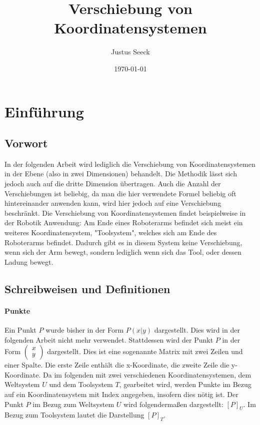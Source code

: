\documentclass{article}
\title{Verschiebung von Koordinatensystemen}
\author{Justus Seeck}
\date{\today}
\newcommand{\m}[1]{\begin{pmatrix}#1\end{pmatrix}}
\begin{document}
    \maketitle

    \tableofcontents

    \newpage

    \section{Einführung}

    \subsection{Vorwort}

    In der folgenden Arbeit wird lediglich die Verschiebung von Koordinatensystemen in der Ebene (also in zwei Dimensionen) behandelt.
    Die Methodik lässt sich jedoch auch auf die dritte Dimension übertragen. Auch die Anzahl der Verschiebungen ist beliebig, da man die
    hier verwendete Formel beliebig oft hintereinander anwenden kann, wird hier jedoch auf eine Verschiebung beschränkt.
    Die Verschiebung von Koordinatensystemen findet beispielweise in der Robotik Anwendung: Am Ende eines Roboterarms befindet sich meist ein weiteres Koordinatensystem,
    "Toolsystem", welches sich am Ende des Roboterarms befindet. Dadurch gibt es in diesem System keine Verschiebung, wenn sich der Arm bewegt,
    sondern lediglich wenn sich das Tool, oder dessen Ladung bewegt.

    \subsection{Schreibweisen und Definitionen}
    
    \paragraph{Punkte}

    Ein Punkt $P$ wurde bisher in der Form $P(x|y)$ dargestellt. Dies wird in der folgenden Arbeit nicht mehr verwendet. Stattdessen wird
    der Punkt $P$ in der Form $\m{x \\ y}$ dargestellt. Dies ist eine sogenannte Matrix mit zwei Zeilen und einer Spalte.
    Die erste Zeile enthält die x-Koordinate, die zweite Zeile die y-Koordinate.
    Da im folgenden mit zwei verschiedenen Koordinatensystemen, dem Weltsystem $U$ und dem Toolsystem $T$, gearbeitet wird,
    werden Punkte im Bezug auf ein Koordinatensystem mit Index angegeben, insofern dies nötig ist.
    Der Punkt $P$ im Bezug zum Weltsystem $U$ wird
    folgendermaßen dargestellt: ${[P]}_{U}$.
    Im Bezug zum Toolsystem lautet die Darstellung ${[P]}_{T}$.
    
\end{document}
